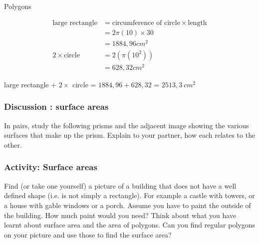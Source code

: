 \begin{exercises}{Polygons}
\begin{wex}
{

\begin{align*}
\mbox{large rectangle} &= \mbox{circumference of circle} \times \mbox{length} \\
                        &= 2\pi(10) \times 30 \\
                        &= 1884,96 cm^2 \\
       2\times \mbox{circle} &= 2(\pi(10^2)) \\
                             &= 628,32 cm^2
\end{align*}

large rectangle + $2\times$ circle = $1884,96 + 628,32$ = $2513,3~cm^2$


}
\end{wex}

\subsubsection{  Discussion : surface areas }
  \nopagebreak
  In pairs, study the following prisms and the adjacent image showing the various surfaces that make up the prism. Explain to your partner, how each relates to the other.
  \par


  \begin{figure}[H] %
    \begin{center}

      \vspace{2pt}
    \vspace{.1in}
    
    \end{center}

 \end{figure}   

    \addtocounter{footnote}{-0}
    
 \par 

\label{m39357*eip-630}
            \subsubsection{ Activity: Surface areas}
            \nopagebreak
            \label{m39357*eip-802}
Find (or take one yourself) a picture of a building that does not have a well defined shape (i.e. is not simply a rectangle). For example a castle with towers, or a house with gable windows or a porch. Assume you have to paint the outside of the building. How much paint would you need? Think about what you have learnt about surface area and the area of polygons. Can you find regular polygons on your picture and use those to find the surface area?
\par \label{m39357*secfhsst!!!underscore!!!id113}

\end{exercises}

